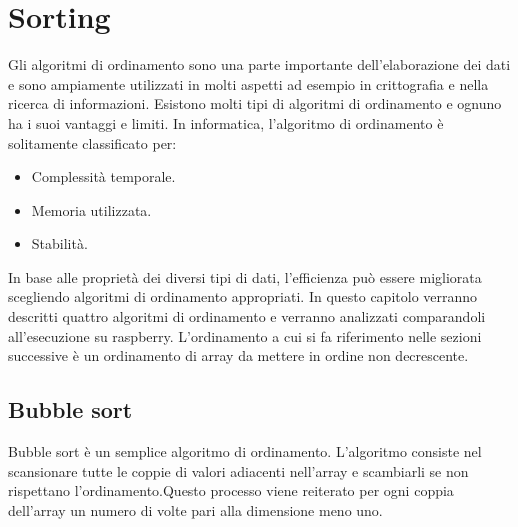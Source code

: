 \documentclass[12pt, a4paper]{report}
\begin{document}

\newpage
\section{Sorting}
Gli algoritmi di ordinamento sono una parte importante dell'elaborazione dei dati e sono ampiamente utilizzati in molti aspetti ad esempio in crittografia e nella ricerca di informazioni. Esistono molti tipi di algoritmi di ordinamento e ognuno ha i suoi vantaggi e limiti. In informatica, l'algoritmo di ordinamento è solitamente classificato per:

\begin{itemize}
	\item Complessità temporale. %
	\item Memoria utilizzata.
	\item Stabilità.%
\end{itemize}

In base alle proprietà dei diversi tipi di dati, l'efficienza può essere migliorata scegliendo algoritmi di ordinamento appropriati. In questo capitolo verranno descritti quattro algoritmi di ordinamento e verranno analizzati comparandoli all'esecuzione su raspberry. L'ordinamento a cui si fa riferimento nelle sezioni successive è un ordinamento di array da mettere in ordine non decrescente.

\subsection{Bubble sort}
Bubble sort è un semplice algoritmo di ordinamento. L'algoritmo consiste nel scansionare tutte le coppie di valori adiacenti nell'array e scambiarli se non rispettano l'ordinamento.Questo processo viene reiterato per ogni coppia dell'array un numero di volte pari alla dimensione meno uno.
\end{document}
